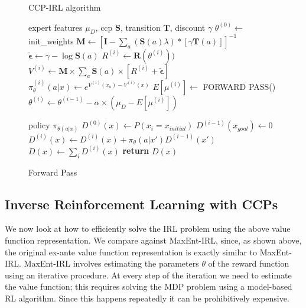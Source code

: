 \documentclass{article}
\begin{document}
\begin{figure}[ht]
\begin{minipage}[t]{0.45\textwidth}
  \begin{algorithm}[H]
    \caption{CCP-IRL algorithm} \label{algo:ccp_irl_algorithm}
    \begin{algorithmic}[1]
         expert features $\mu_D$, ccp $\mathbf{S}$, transition $\mathbf{T}$, discount $\gamma$
        \STATE $\theta^{(0)} \gets$ init\_weights
        \STATE $\mathbf{M} \gets \left[\mathbf{I}-\sum_{a}(\mathbf{S}(a) \lambda) *\left[ \gamma \mathbf{T}(a)  \right]\right]^{-1}$ 
        \STATE $\tilde{\bm{\epsilon}} \gets \gamma - \log \mathbf{S}(a)$
            \STATE $R^{(i)} \gets \mathbf{R}(\theta^{(i)}))$
            \STATE $V^{(i)} \gets \mathbf{M} \times \sum_{a}{\mathbf{S}(a) \times \left[ R^{(i)} +\tilde{\bm{\epsilon}}\right]}$
            \STATE $\pi_{\theta}^{(i)}(a|x) \gets e^{V^{(i)}(x_a) - V^{(i)}(x)}$
            \STATE $E[\mu^{(i)}] \gets $ FORWARD PASS()
            \STATE $\theta^{(i)} \gets \theta^{(i-1)} - \alpha \times (\mu_D - E[\mu^{(i)}])$
        \ENDFOR
    \end{algorithmic}
  \end{algorithm}
\end{minipage}%
\qquad
\begin{minipage}[t]{0.45\textwidth}
  \begin{algorithm}[H]
    \caption{Forward Pass} \label{algo:forward_pass_algorithm}
    \begin{algorithmic}[1]
         policy $\pi_{\theta(a|x)}$
        \STATE $D^{(0)}(x) \gets P(x_i = x_{initial})$
            \STATE $D^{(i-1)}(x_{goal}) \gets 0$
            \STATE $D^{(i)}(x) \gets D^{(i)}(x) + \pi_{\theta}(a|x') D^{(i-1)}(x')$
        \ENDFOR
        \STATE $D(x) \gets \sum_{i}D^{(i)}(x)$ 
        \STATE \textbf{return} $D(x)$
    \end{algorithmic}
  \end{algorithm}
\end{minipage}
\end{figure}


\subsection{Inverse Reinforcement Learning with CCPs}
We now look at how to efficiently solve the IRL problem using the above value function representation. 
We compare against MaxEnt-IRL, since, as shown above, the original ex-ante value function representation is exactly similar to MaxEnt-IRL.
MaxEnt-IRL involves estimating the parameters $\theta$ of the reward function using an iterative procedure.
At every step of the iteration we need to estimate the value function; this requires solving the MDP problem using a model-based RL algorithm. Since this happens repeatedly it can be prohibitively expensive.
\end{document}
